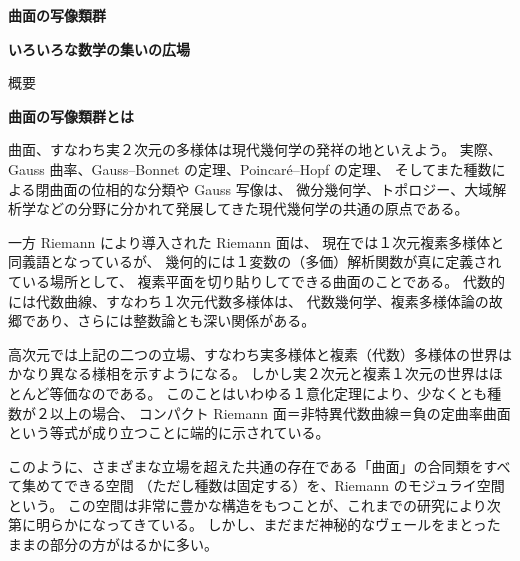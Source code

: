 \documentclass[uplatex,dvipdfmx]{jlreq}
\begin{document}
\begin{center}
  \vspace*{20pt}
  {\Huge\bfseries 曲面の写像類群}

  \vspace{10pt}

  {\Large\bfseries いろいろな数学の集いの広場}

  \vspace{10pt}

  {\large 概要}
\end{center}
\vfill

\newpage

\begin{center}
{\large\bfseries 曲面の写像類群とは}

\hspace*{\fill}{\large\bfseries 森田 茂之（東大・数理）}
\end{center}

\medskip

曲面、すなわち実２次元の多様体は現代幾何学の発祥の地といえよう。
実際、Gauss 曲率、Gauss--Bonnet の定理、Poincaré--Hopf の定理、
そしてまた種数による閉曲面の位相的な分類や Gauss 写像は、
微分幾何学、トポロジー、大域解析学などの分野に分かれて発展してきた現代幾何学の共通の原点である。

一方 Riemann により導入された Riemann 面は、
現在では１次元複素多様体と同義語となっているが、
幾何的には１変数の（多価）解析関数が真に定義されている場所として、
複素平面を切り貼りしてできる曲面のことである。
代数的には代数曲線、すなわち１次元代数多様体は、
代数幾何学、複素多様体論の故郷であり、さらには整数論とも深い関係がある。

高次元では上記の二つの立場、すなわち実多様体と複素（代数）多様体の世界は
かなり異なる様相を示すようになる。
しかし実２次元と複素１次元の世界はほとんど等価なのである。
このことはいわゆる１意化定理により、少なくとも種数が２以上の場合、
コンパクト Riemann 面＝非特異代数曲線＝負の定曲率曲面という等式が成り立つことに端的に示されている。

このように、さまざまな立場を超えた共通の存在である「曲面」の合同類をすべて集めてできる空間
（ただし種数は固定する）を、Riemann のモジュライ空間という。
この空間は非常に豊かな構造をもつことが、これまでの研究により次第に明らかになってきている。
しかし、まだまだ神秘的なヴェールをまとったままの部分の方がはるかに多い。
\end{document}
